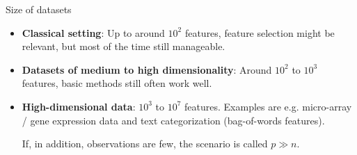 \documentclass[11pt,compress,t,notes=noshow, xcolor=table]{beamer}
\begin{document}
  \begin{vbframe}{Size of datasets}
    \begin{itemize}
      \item \textbf{Classical setting}: Up to around $10^2$ features,
        feature selection might be relevant, but most of the time still manageable.
      \item \textbf{Datasets of medium to high dimensionality}:
        Around $10^2$ to $10^3$ features, basic methods still often work well.
      \item \textbf{High-dimensional data}: $10^3$ to $10^7$ features.
        Examples are e.g. micro-array / gene expression data and text categorization (bag-of-words features).

        If, in addition, observations are few, the scenario is called $p \gg n$.
    \end{itemize}

  \end{vbframe}
\end{document}
